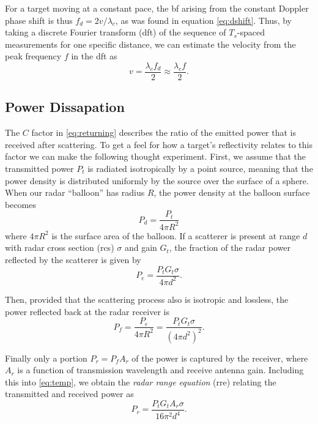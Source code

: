 For a target moving at a constant pace, the \gls{bf} arising from the constant Doppler phase shift is thus $f_d = 2v/\lambda_c$, as was found in equation \eqref{eq:dshift}. Thus, by taking a discrete Fourier transform (\gls{dft}) of the sequence of $T_s$-spaced measurements for one specific distance, we can estimate the velocity from the peak frequency $f$ in the \gls{dft} as 
\begin{equation}\label{eq:dopp}
	v = \frac{\lambda_c f_d}{2}
	\approx \frac{\lambda_c f}{2}.
\end{equation}


\subsection{Power Dissapation}

The $C$ factor in \eqref{eq:returning} describes the ratio of the emitted power that is received after scattering. To get a feel for how a target's reflectivity relates to this factor we can make the following thought experiment. First, we assume that the transmitted power $P_t$ is radiated isotropically by a point source, meaning that the power density is distributed uniformly by the source over the surface of a sphere. When our radar ``balloon'' has radius $R$, the power density at the balloon surface becomes  \citep{amin_2017}
\begin{equation}
	P_d 
	= \frac{P_t}{4\pi R^2}
\end{equation}
where $4\pi R^2$ is the surface area of the balloon. If a scatterer is present at range $d$ with radar cross section (\gls{rcs}) $\sigma$ and gain $G_t$, the fraction of the radar power reflected by the scatterer is given by 
\begin{equation}
	P_{e}
	= \frac{P_tG_t\sigma}{4\pi d^2}.
\end{equation}

Then, provided that the scattering process also is isotropic and lossless, the power reflected back at the radar receiver is
\begin{equation}\label{eq:temp}
	P_f 
	= \frac{P_e}{4\pi R^2} 
	= \frac{P_t G_t \sigma}{(4\pi d^2)^2}.
\end{equation}

Finally only a portion $P_r = P_fA_r$ of the power is captured by the receiver, where $A_r$ is a function of transmission wavelength and receive antenna gain. Including this into \eqref{eq:temp}, we obtain the \emph{radar range equation} (\gls{rre}) relating the transmitted and received power as
\begin{equation}
	P_r
	= \frac{P_t G_t A_r \sigma}{16\pi^2 d^4}.
\end{equation}

